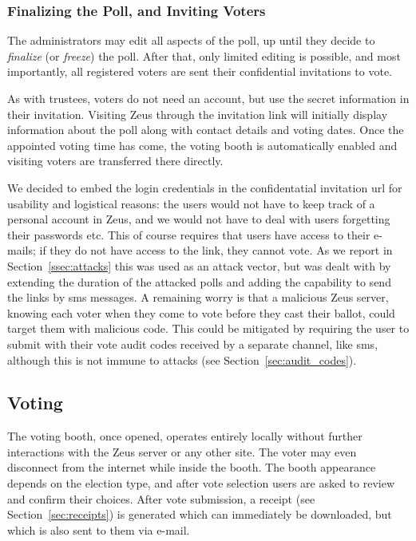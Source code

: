 \documentclass[jets]{usenixjournal}
\begin{document}
\subsubsection{Finalizing the Poll, and Inviting Voters}
The administrators may edit all aspects of the poll, up until they
decide to \emph{finalize} (or \emph{freeze}) the poll.
After that, only limited editing is possible, and most importantly,
all registered voters are sent their confidential invitations to vote.

As with trustees, voters do not need an account, but use the secret
information in their invitation.
Visiting Zeus through the invitation link will initially display
information about the poll along with contact details and voting dates.
Once the appointed voting time has come, the voting booth is
automatically enabled and visiting voters are transferred there directly.

We decided to embed the login credentials in the confidentatial
invitation {\sc url} for usability and logistical reasons: the users
would not have to keep track of a personal account in Zeus, and we
would not have to deal with users forgetting their passwords etc. This
of course requires that users have access to their e-mails; if they do
not have access to the link, they cannot vote. As we report in
Section~\ref{ssec:attacks} this was used as an attack vector, but was
dealt with by extending the duration of the attacked polls and adding
the capability to send the links by {\sc sms} messages. A remaining
worry is that a malicious Zeus server, knowing each voter when they
come to vote before they cast their ballot, could target them with
malicious code. This could be mitigated by requiring the user to
submit with their vote audit codes received by a separate channel,
like {\sc sms}, although this is not immune to attacks
(see Section~\ref{sec:audit_codes}).

\subsection{Voting}
The voting booth, once opened, operates entirely locally without
further interactions with the Zeus server or any other site.
The voter may even disconnect from the internet while inside the booth.
The booth appearance depends on the election type, and after vote
selection users are asked to review and confirm their choices.
After vote submission, a receipt (see Section~\ref{sec:receipts}) is
generated which can immediately be downloaded, but which is also sent
to them via e-mail.
\end{document}
